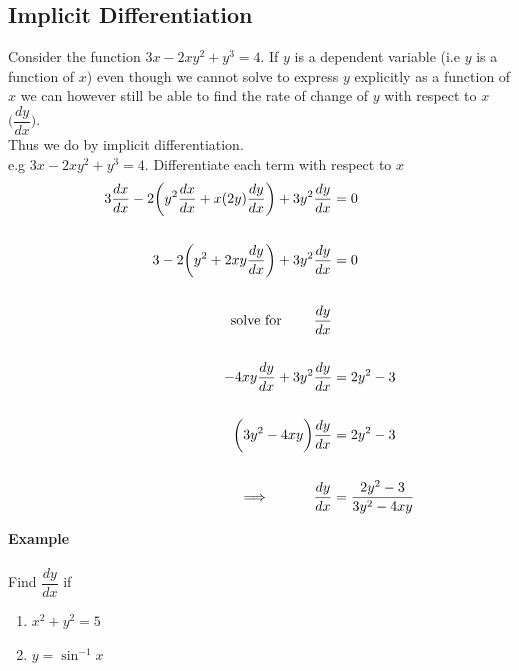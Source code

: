 \documentclass[11pt,a4paper]{article}
\begin{document}
\subsection{Implicit Differentiation}
Consider the function $3x-2xy^2+y^3=4$. If $y$ is a dependent variable (i.e $y$ is a function of $x$) even though we cannot solve to express $y$ explicitly as a function of $x$ we can however still be able to find the rate of change of $y$ with respect to $x$ $\bigg(\dfrac{dy}{dx}\bigg)$.\\
Thus we do by implicit differentiation. \\
e.g $3x-2xy^2+y^3=4$. Differentiate each term with respect to $x$
\begin{align*}
3\frac{dx}{dx}-2\bigg(y^2\frac{dx}{dx}+x(2y)\frac{dy}{dx}\bigg)+3y^2\frac{dy}{dx} &=0\\\\
3-2\bigg(y^2+2xy\frac{dy}{dx}\bigg)+3y^2\frac{dy}{dx} &=0\\\\
\text{solve for}\hspace{0.8cm} \frac{dy}{dx}\\\\
-4xy\frac{dy}{dx}+3y^2\frac{dy}{dx} & = 2y^2-3\\\\
\bigg(3y^2-4xy\bigg)\frac{dy}{dx} & =2y^2-3\\\\
\implies \hspace{1cm} \frac{dy}{dx} & =\frac{2y^2-3}{3y^2-4xy}\\
\end{align*}

\textbf{Example} \\\\
Find $\dfrac{dy}{dx}$ if
\begin{enumerate}
\item $x^2+y^2=5$\\
\item $y=\sin^{-1}x$\\
\end{enumerate}














\pagebreak
\end{document}
